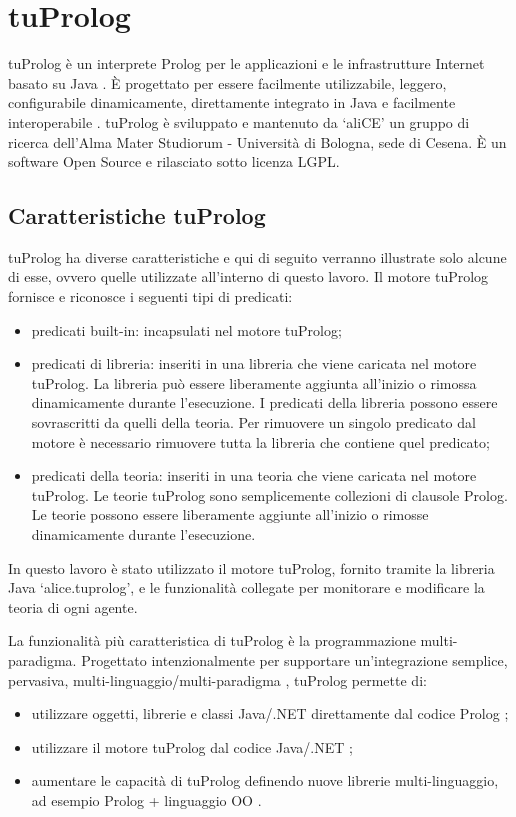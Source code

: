 \section{tuProlog}
tuProlog è un interprete Prolog per le applicazioni e le infrastrutture Internet basato su Java \cite{tuProlog}. \`E progettato per essere facilmente utilizzabile, leggero, configurabile dinamicamente, direttamente integrato in Java e facilmente interoperabile \cite{2p-alpnews2013}.
tuProlog è sviluppato e mantenuto da `aliCE' un gruppo di ricerca dell'Alma Mater Studiorum - Università di Bologna, sede di Cesena. \`E un software Open Source e rilasciato sotto licenza LGPL.

\subsection{Caratteristiche tuProlog}
tuProlog ha diverse caratteristiche e qui di seguito verranno illustrate solo alcune di esse, ovvero quelle utilizzate all'interno di questo lavoro.
Il motore tuProlog fornisce e riconosce i seguenti tipi di predicati:
\begin{itemize}
\item predicati built-in: incapsulati nel motore tuProlog;
\item predicati di libreria: inseriti in una libreria che viene caricata nel motore tuProlog. La libreria può essere liberamente aggiunta all'inizio o rimossa dinamicamente durante l'esecuzione. I predicati della libreria possono essere sovrascritti da quelli della teoria. Per rimuovere un singolo predicato dal motore è necessario rimuovere tutta la libreria che contiene quel predicato;
\item predicati della teoria: inseriti in una teoria che viene caricata nel motore tuProlog. Le teorie tuProlog sono semplicemente collezioni di clausole Prolog. Le teorie possono essere liberamente aggiunte all'inizio o rimosse dinamicamente durante l'esecuzione.
\end{itemize}

In questo lavoro è stato utilizzato il motore tuProlog, fornito tramite la libreria Java `alice.tuprolog', e le funzionalità collegate per monitorare e modificare la teoria di ogni agente.

La funzionalità più caratteristica di tuProlog è la programmazione multi-paradigma.
Progettato intenzionalmente per supportare un'integrazione semplice, pervasiva, multi-linguaggio/multi-paradigma \cite{2p-alpnews2013}, tuProlog permette di:
\begin{itemize}
   \item utilizzare oggetti, librerie e classi Java/.NET direttamente dal codice Prolog \cite{2p-alpnews2013};
   \item utilizzare il motore tuProlog dal codice Java/.NET \cite{2p-alpnews2013};
   \item aumentare le capacità di tuProlog definendo nuove librerie multi-linguaggio, ad esempio Prolog + linguaggio OO \cite{2p-alpnews2013}.
\end{itemize}

